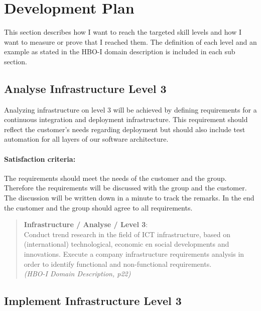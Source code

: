 
\section{Development Plan}
\label{sec:development}

This section describes how I want to reach the targeted skill levels and how I want to measure or prove that I reached them.
The definition of each level and an example as stated in the HBO-I domain description is included in each sub section.


\subsection{Analyse Infrastructure Level 3}
\label{ai3}

Analyzing infrastructure on level 3 will be achieved by defining requirements for a continuous integration and deployment infrastructure. This requirement should reflect the customer's needs regarding deployment but should also include test automation for all layers of our software architecture. 

\paragraph{Satisfaction criteria:} The requirements should meet the needs of the customer and the group. Therefore the requirements will be discussed with the group and the customer. The discussion will be written down in a minute to track the remarks. In the end the customer and the group should agree to all requirements.

\begin{minipage}{\textwidth}
\begin{quote}
	\textbf{Infrastructure / Analyse / Level 3}: \\
	Conduct trend research in the field of ICT infrastructure, based on (international) technological, economic en social developments and innovations. 
	Execute a company infrastructure requirements analysis in order to identify functional and non-functional requirements.
	\\ \textit{(HBO-I Domain Description, p22)}
\end{quote}
\end{minipage}

\subsection{Implement Infrastructure Level 3}

